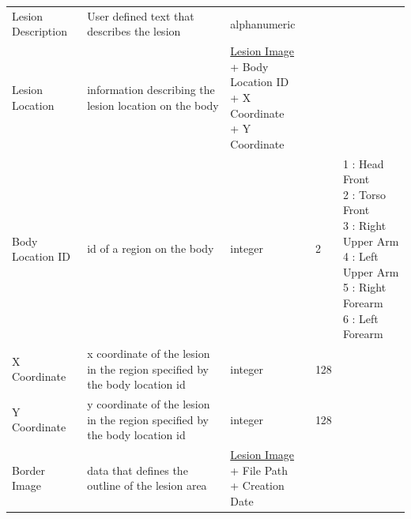 {\begin{longtable}[H]{ | p{2.5cm} | p{2.5cm} | p{2.5cm} | p{1.0cm} | p{2.5cm} | }
                     & & \\ \hline

                    Lesion Description & User defined text that describes the lesion &
                    alphanumeric &  &  \\ \hline

                    Lesion Location & information describing the lesion location on the body &

                        \specialcell[t]{\hyperlink{lesion_image}{Lesion Image}
                           \\ + Body Location ID
                           \\ + X Coordinate
                           \\ + Y Coordinate
                        }

                     & & \\ \hline


                    Body Location ID & id of a region on the body &
                    integer & 2 &

                        \specialcell[t]{
                            1 : Head Front \\
                            2 : Torso Front \\
                            3 : Right Upper Arm \\
                            4 : Left Upper Arm \\
                            5 : Right Forearm \\
                            6 : Left Forearm \\

                        }

                     \\ \hline

                    X Coordinate & x coordinate of the lesion in the region specified by the body location id &
                    integer & 128 &  \\ \hline

                    Y Coordinate & y coordinate of the lesion in the region specified by the body location id &
                    integer & 128 &  \\ \hline

                    Border Image & data that defines the outline of the lesion area &

                        \specialcell[t]{\hyperlink{lesion_image}{Lesion Image}
                           \\ + File Path
                           \\ + Creation Date
                        }


\end{longtable}}
